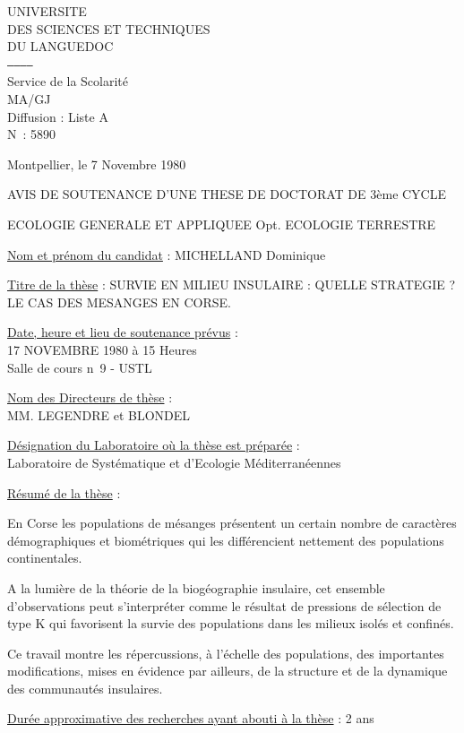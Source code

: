 UNIVERSITE\\
DES SCIENCES ET TECHNIQUES\\
DU LANGUEDOC\\
\texttt{------------}\\
Service de la Scolarité\\
MA/GJ\\
Diffusion : Liste A\\
N\textdegree\ : 5890

Montpellier, le 7 Novembre 1980

AVIS DE SOUTENANCE D'UNE THESE DE DOCTORAT DE 3ème CYCLE

ECOLOGIE GENERALE ET APPLIQUEE Opt. ECOLOGIE TERRESTRE


\uline{Nom et prénom du candidat} : MICHELLAND Dominique

\uline{Titre de la thèse} : SURVIE EN MILIEU INSULAIRE : QUELLE STRATEGIE ? LE CAS DES MESANGES EN CORSE.

\uline{Date, heure et lieu de soutenance prévus} :\\
17 NOVEMBRE 1980 à 15 Heures\\
Salle de cours n\textdegree\ 9 - USTL

\uline{Nom des Directeurs de thèse} :\\
MM. LEGENDRE et BLONDEL

\uline{Désignation du Laboratoire où la thèse est préparée} :\\
Laboratoire de Systématique et d'Ecologie Méditerranéennes

\uline{Résumé de la thèse} :

En Corse les populations de mésanges présentent un certain nombre de caractères démographiques et biométriques qui les différencient nettement des populations continentales.

A la lumière de la théorie de la biogéographie insulaire, cet ensemble d'observations peut s'interpréter comme le résultat de pressions de sélection de type K qui favorisent la survie des populations dans les milieux isolés et confinés.

Ce travail montre les répercussions, à l'échelle des populations, des importantes modifications, mises en évidence par ailleurs, de la structure et de la dynamique des communautés insulaires.

\uline{Durée approximative des recherches ayant abouti à la thèse} : 2 ans

